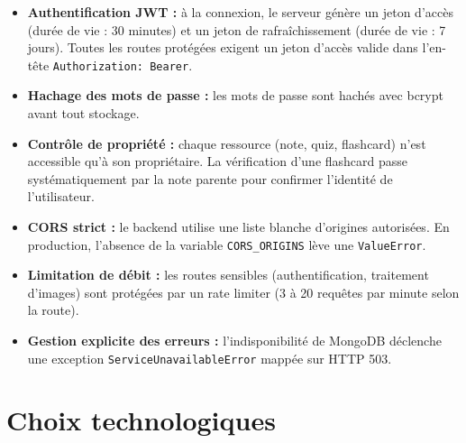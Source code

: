 \documentclass[12pt,a4paper]{report}
\begin{document}
\begin{itemize}[label=--]
    \item \textbf{Authentification JWT :} à la connexion, le serveur génère un jeton d'accès (durée de vie : 30 minutes) et un jeton de rafraîchissement (durée de vie : 7 jours). Toutes les routes protégées exigent un jeton d'accès valide dans l'en-tête \texttt{Authorization: Bearer}.
    \item \textbf{Hachage des mots de passe :} les mots de passe sont hachés avec bcrypt avant tout stockage.
    \item \textbf{Contrôle de propriété :} chaque ressource (note, quiz, flashcard) n'est accessible qu'à son propriétaire. La vérification d'une flashcard passe systématiquement par la note parente pour confirmer l'identité de l'utilisateur.
    \item \textbf{CORS strict :} le backend utilise une liste blanche d'origines autorisées. En production, l'absence de la variable \texttt{CORS\_ORIGINS} lève une \texttt{ValueError}.
    \item \textbf{Limitation de débit :} les routes sensibles (authentification, traitement d'images) sont protégées par un rate limiter (3 à 20 requêtes par minute selon la route).
    \item \textbf{Gestion explicite des erreurs :} l'indisponibilité de MongoDB déclenche une exception \texttt{ServiceUnavailableError} mappée sur HTTP 503.
\end{itemize}

\section{Choix technologiques}
\end{document}
